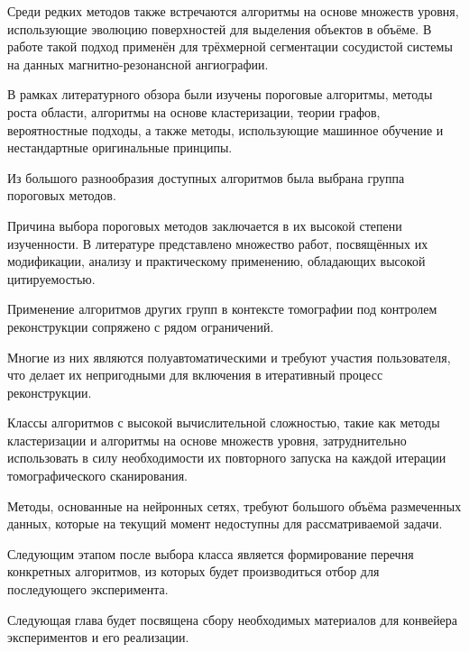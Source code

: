 Среди редких методов также встречаются алгоритмы на основе множеств уровня, использующие эволюцию поверхностей для выделения объектов в объёме. В работе \cite{farag20043d} такой подход применён для трёхмерной сегментации сосудистой системы на данных магнитно-резонансной ангиографии.

В рамках литературного обзора были изучены пороговые алгоритмы, методы роста области, алгоритмы на основе кластеризации, теории графов, вероятностные подходы, а также методы, использующие машинное обучение и нестандартные оригинальные принципы.

Из большого разнообразия доступных алгоритмов была выбрана группа пороговых методов.

Причина выбора пороговых методов заключается в их высокой степени изученности. В литературе представлено множество работ, посвящённых их модификации, анализу и практическому применению, обладающих высокой цитируемостью.

Применение алгоритмов других групп в контексте томографии под контролем реконструкции сопряжено с рядом ограничений. 

Многие из них являются полуавтоматическими и требуют участия пользователя, что делает их непригодными для включения в итеративный процесс реконструкции. 

Классы алгоритмов с высокой вычислительной сложностью, такие как методы кластеризации и алгоритмы на основе множеств уровня, затруднительно использовать в силу необходимости их повторного запуска на каждой итерации томографического сканирования. 

Методы, основанные на нейронных сетях, требуют большого объёма размеченных данных, которые на текущий момент недоступны для рассматриваемой задачи.

Следующим этапом после выбора класса является формирование перечня конкретных алгоритмов, из которых будет производиться отбор для последующего эксперимента.

Следующая глава будет посвящена сбору необходимых материалов для конвейера экспериментов и его реализации.